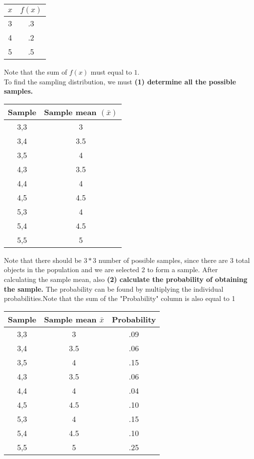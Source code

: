 \documentclass[12pt]{article}
\begin{document}
\begin{center}
\begin{tabular}{ |c|c| } 
 \hline
 $x$ & $f(x)$ \\ 
 \hline
 3 & .3 \\ 
 4 & .2 \\ 
 5 & .5 \\
 \hline
\end{tabular}
\end{center}
Note that the sum of $f(x)$ must equal to $1$. \\
To find the sampling distribution, we must \textbf{(1) determine all the possible samples.} \\
\begin{center}
\begin{tabular}{ |c|c| } 
 \hline
 Sample & Sample mean $(\bar{x})$ \\ 
 \hline
 3,3 & 3 \\
 3,4 & 3.5 \\ 
 3,5 & 4 \\ 
 4,3 & 3.5 \\
 4,4 & 4 \\
 4,5 & 4.5 \\
 5,3 & 4 \\
 5,4 & 4.5 \\
 5,5 & 5 \\ 
 \hline
\end{tabular}
\end{center}
Note that there should be $3*3$ number of possible samples, since there are 3 total objects in the population and we are selected 2 to form a sample. After calculating the sample mean, also \textbf{(2) calculate the probability of obtaining the sample.} The probability can be found by multiplying the individual probabilities.Note that the sum of the "Probability" column is also equal to 1\\
\begin{center}
\begin{tabular}{ |c|c|c|} 
 \hline
 Sample & Sample mean $\bar{x}$ & Probability\\ 
 \hline
 3,3 & 3 &.09\\
 3,4 & 3.5 & .06 \\ 
 3,5 & 4 &.15 \\ 
 4,3 & 3.5 &.06 \\
 4,4 & 4 & .04\\
 4,5 & 4.5 &.10 \\
 5,3 & 4 & .15\\
 5,4 & 4.5 &.10\\
 5,5 & 5 &.25\\ 
 \hline
\end{tabular}
\end{center}
\end{document}

